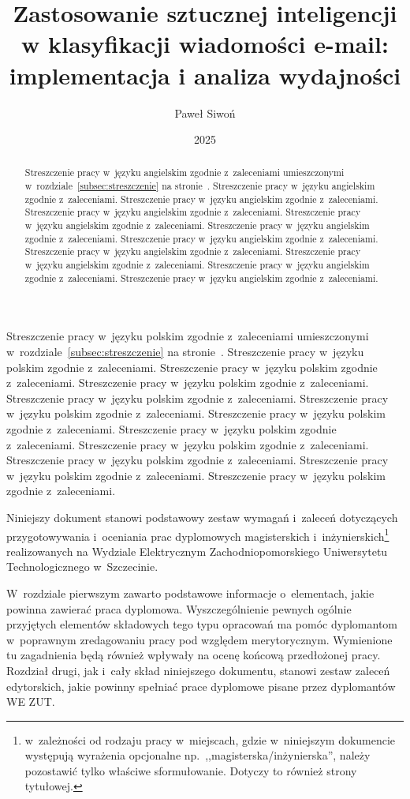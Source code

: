 \documentclass[skorowidz,skroty]{dyplomWEZUT}
\author{Paweł Siwoń}
\title{Zastosowanie sztucznej inteligencji w klasyfikacji wiadomości e-mail: implementacja i analiza wydajności}
\date{2025}
\begin{document}
\begin{streszczenie}
Streszczenie pracy w~języku polskim zgodnie z~zaleceniami umieszczonymi w~rozdziale~\ref{subsec:streszczenie} na stronie~\pageref{subsec:streszczenie}. Streszczenie pracy w~języku polskim zgodnie z~zaleceniami. Streszczenie pracy w~języku polskim zgodnie z~zaleceniami. Streszczenie pracy w~języku polskim zgodnie z~zaleceniami. Streszczenie pracy w~języku polskim zgodnie z~zaleceniami. Streszczenie pracy w~języku polskim zgodnie z~zaleceniami. Streszczenie pracy w~języku polskim zgodnie z~zaleceniami. Streszczenie pracy w~języku polskim zgodnie z~zaleceniami. Streszczenie pracy w~języku polskim zgodnie z~zaleceniami. Streszczenie pracy w~języku polskim zgodnie z~zaleceniami. Streszczenie pracy w~języku polskim zgodnie z~zaleceniami. Streszczenie pracy w~języku polskim zgodnie z~zaleceniami.
\end{streszczenie}

\begin{abstract}
Streszczenie pracy w~języku angielskim zgodnie z~zaleceniami umieszczonymi w~rozdziale~\ref{subsec:streszczenie} na stronie~\pageref{subsec:streszczenie}. Streszczenie pracy w~języku angielskim zgodnie z~zaleceniami. Streszczenie pracy w~języku angielskim zgodnie z~zaleceniami. Streszczenie pracy w~języku angielskim zgodnie z~zaleceniami. Streszczenie pracy w~języku angielskim zgodnie z~zaleceniami. Streszczenie pracy w~języku angielskim zgodnie z~zaleceniami. Streszczenie pracy w~języku angielskim zgodnie z~zaleceniami. Streszczenie pracy w~języku angielskim zgodnie z~zaleceniami. Streszczenie pracy w~języku angielskim zgodnie z~zaleceniami. Streszczenie pracy w~języku angielskim zgodnie z~zaleceniami. Streszczenie pracy w~języku angielskim zgodnie z~zaleceniami.
\end{abstract}

\maketitle

\begin{wprowadzenie}

Niniejszy dokument stanowi podstawowy zestaw wymagań i~zaleceń dotyczących przygotowywania i~oceniania prac dyplomowych magisterskich i~inżynierskich\footnote{w~zależności od rodzaju pracy w~miejscach, gdzie w~niniejszym dokumencie występują wyrażenia opcjonalne np.~,,magisterska/inżynierska'', należy pozostawić tylko właściwe sformułowanie. Dotyczy to również strony tytułowej.} realizowanych na Wydziale Elektrycznym Zachodniopomorskiego Uniwersytetu Technologicznego w~Szczecinie.

W~rozdziale pierwszym zawarto podstawowe informacje o~elementach, jakie powinna zawierać praca dyplomowa. Wyszczególnienie pewnych ogólnie przyjętych elementów składowych tego typu opracowań ma pomóc dyplomantom w~poprawnym zredagowaniu pracy pod względem merytorycznym. Wymienione tu zagadnienia będą również wpływały na ocenę końcową przedłożonej pracy.  Rozdział drugi, jak i~cały skład niniejszego dokumentu, stanowi zestaw zaleceń edytorskich, jakie powinny spełniać prace dyplomowe pisane przez dyplomantów WE ZUT.

\end{wprowadzenie}
\end{document}
